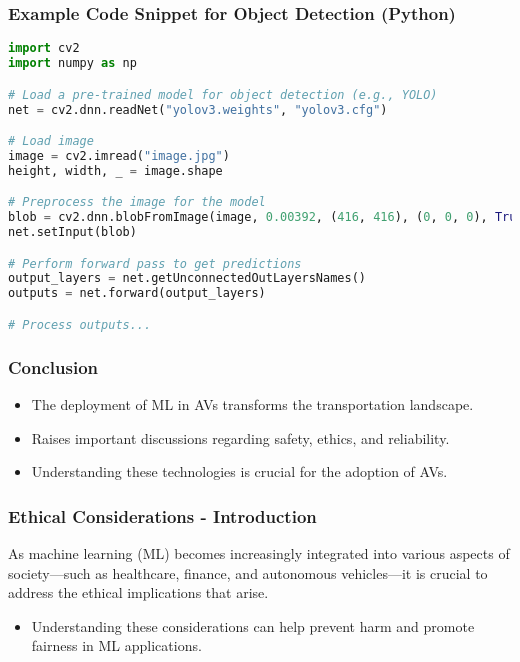 \documentclass{beamer}
\begin{document}
\begin{frame}[fragile]
    \frametitle{Example Code Snippet for Object Detection (Python)}
    \begin{lstlisting}[language=Python]
import cv2
import numpy as np

# Load a pre-trained model for object detection (e.g., YOLO)
net = cv2.dnn.readNet("yolov3.weights", "yolov3.cfg")

# Load image
image = cv2.imread("image.jpg")
height, width, _ = image.shape

# Preprocess the image for the model
blob = cv2.dnn.blobFromImage(image, 0.00392, (416, 416), (0, 0, 0), True, crop=False)
net.setInput(blob)

# Perform forward pass to get predictions
output_layers = net.getUnconnectedOutLayersNames()
outputs = net.forward(output_layers)

# Process outputs...
    \end{lstlisting}
\end{frame}

\begin{frame}[fragile]
    \frametitle{Conclusion}
    \begin{itemize}
        \item The deployment of ML in AVs transforms the transportation landscape.
        \item Raises important discussions regarding safety, ethics, and reliability.
        \item Understanding these technologies is crucial for the adoption of AVs.
    \end{itemize}
\end{frame}

\begin{frame}[fragile]
    \frametitle{Ethical Considerations - Introduction}
    As machine learning (ML) becomes increasingly integrated into various aspects of society—such as healthcare, finance, and autonomous vehicles—it is crucial to address the ethical implications that arise. 
    \begin{itemize}
        \item Understanding these considerations can help prevent harm and promote fairness in ML applications.
    \end{itemize}
\end{frame}
\end{document}
